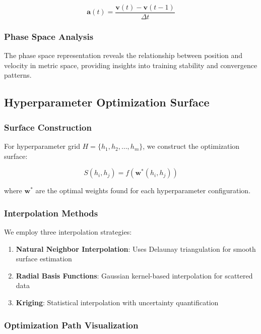 \documentclass[12pt,a4paper]{article}
\begin{document}
\begin{equation}
    \mathbf{a}(t) = \frac{\mathbf{v}(t) - \mathbf{v}(t-1)}{\Delta t}
\end{equation}

\subsubsection{Phase Space Analysis}

The phase space representation reveals the relationship between position and velocity in metric space, providing insights into training stability and convergence patterns.

\subsection{Hyperparameter Optimization Surface}
\label{subsec:hyperparameter}

\subsubsection{Surface Construction}

For hyperparameter grid \( H = \{h_1, h_2, \dots, h_m\} \), we construct the optimization surface:

\begin{equation}
    S(h_i, h_j) = f(\mathbf{w}^*(h_i, h_j))
\end{equation}

where \( \mathbf{w}^* \) are the optimal weights found for each hyperparameter configuration.

\subsubsection{Interpolation Methods}

We employ three interpolation strategies:

\begin{enumerate}
    \item \textbf{Natural Neighbor Interpolation}: Uses Delaunay triangulation for smooth surface estimation
    \item \textbf{Radial Basis Functions}: Gaussian kernel-based interpolation for scattered data
    \item \textbf{Kriging}: Statistical interpolation with uncertainty quantification
\end{enumerate}

\subsubsection{Optimization Path Visualization}
\end{document}
